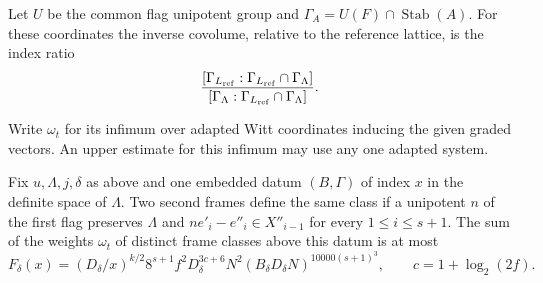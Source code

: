 Let \(U\) be the common flag unipotent group and
\(\Gamma_A=U(F)\cap\operatorname{Stab}(A)\).
For these coordinates the inverse covolume, relative to the
reference lattice, is the index ratio
\[
 \frac{[\Gamma_{L_{\rm ref}}:\Gamma_{L_{\rm ref}}\cap\Gamma_\Lambda]}
      {[\Gamma_\Lambda:\Gamma_{L_{\rm ref}}\cap\Gamma_\Lambda]} .
\]

Write \(\omega_t\) for its infimum over adapted Witt coordinates
inducing the given graded vectors. An upper estimate for this
infimum may use any one adapted system.

\begin{auxlemma}
\label{lem:zero-gram-frame-count}
Fix \(u,\Lambda,j,\delta\) as above and one embedded datum
\((B,\Gamma)\) of index \(x\) in the definite space of \(\Lambda\).
Two second frames define the same class if a unipotent \(n\)
of the first flag preserves \(\Lambda\) and
\(n e'_i-e''_i\in X''_{i-1}\) for every \(1\le i\le s+1\). The sum of the weights \(\omega_t\)
of distinct frame classes above this datum is at most
\begin{equation}\label{eq:zero-gram-frame-bound}
 F_\delta(x)=
 (D_\delta/x)^{k/2}8^{s+1}f^2D_\delta^{3c+6}N^2
       (B_\delta D_\delta N)^{10000(s+1)^3},
 \qquad c=1+\log_2(2f).
\end{equation}
\end{auxlemma}

